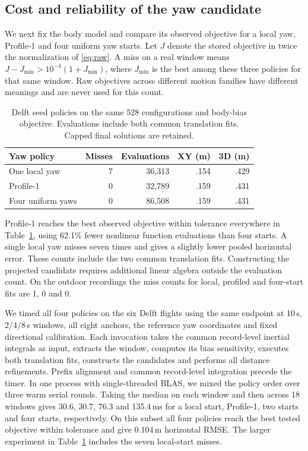 \documentclass{IEEEtaes}
\begin{document}
\subsection{Cost and reliability of the yaw candidate}
We next fix the body model and compare its observed objective for a local yaw, Profile-1 and four uniform yaw starts. Let \(J\) denote the stored objective in twice the normalization of \eqref{eq:raw}. A miss on a real window means \(J-J_{\min}>10^{-4}(1+J_{\min})\), where \(J_{\min}\) is the best among these three policies for that same window. Raw objectives across different motion families have different meanings and are never used for this count.

\begin{table}[t]
\caption{Delft seed policies on the same 528 configurations and body-bias objective. Evaluations include both common translation fits. Capped final solutions are retained.}
\label{tab:seed}\centering\tablefont
\begin{tabular}{@{}lrrrr@{}}
\toprule
Yaw policy&Misses&Evaluations&XY (m)&3D (m)\\\midrule
One local yaw&7&36,313&.154&.429\\
Profile-1&0&32,789&.159&.431\\
Four uniform yaws&0&86,508&.159&.431\\\bottomrule
\end{tabular}
\end{table}

Profile-1 reaches the best observed objective within tolerance everywhere in Table~\ref{tab:seed}, using 62.1\% fewer nonlinear function evaluations than four starts. A single local yaw misses seven times and gives a slightly lower pooled horizontal error. These counts include the two common translation fits. Constructing the projected candidate requires additional linear algebra outside the evaluation count. On the outdoor recordings the miss counts for local, profiled and four-start fits are 1, 0 and 0.

We timed all four policies on the six Delft flights using the same endpoint at 10\,s, 2/4/8\,s windows, all eight anchors, the reference yaw coordinates and fixed directional calibration. Each invocation takes the common record-level inertial integrals as input, extracts the window, computes its bias sensitivity, executes both translation fits, constructs the candidates and performs all distance refinements. Prefix alignment and common record-level integration precede the timer. In one process with single-threaded BLAS, we mixed the policy order over three warm serial rounds. Taking the median on each window and then across 18 windows gives 30.6, 30.7, 76.3 and 135.4\,ms for a local start, Profile-1, two starts and four starts, respectively. On this subset all four policies reach the best tested objective within tolerance and give 0.104\,m horizontal RMSE. The larger experiment in Table~\ref{tab:seed} includes the seven local-start misses.
\end{document}
